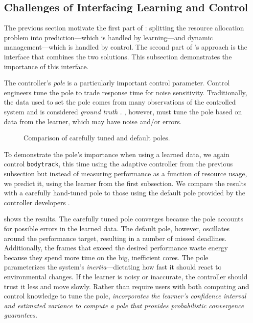 \subsection{Challenges of Interfacing Learning and Control}
The previous section motivate the first part of \SYSTEM{}: splitting
the resource allocation problem into prediction---which is handled by
learning---and dynamic management---which is handled by control. The
second part of \SYSTEM{}'s approach is the interface that combines the
two solutions.  This subsection demonstrates the importance of this
interface.

The controller's \emph{pole} is a particularly important control
parameter.  Control engineers tune the pole to trade response time for
noise sensitivity.  Traditionally, the data used to set the pole comes
from many observations of the controlled system and is considered
\emph{ground truth} \cite{Hellerstein2004a}.  \SYSTEM{}, however, must
tune the pole based on data from the learner, which may have noise
and/or errors.



\begin{figure} 

\caption{Comparison of carefully tuned and default poles.}
\label{fig:not-simple}
\end{figure}
To demonstrate the pole's importance when using a learned data, we
again control \texttt{bodytrack}, this time using the adaptive
controller from the previous subsection but instead of measuring
performance as a function of resource usage, we predict it, using the
learner from the first subsection.  We compare the results with a
carefully hand-tuned pole to those using the default pole provided by
the controller developers \cite{POET}.

 shows the results.  The carefully tuned pole
converges because the pole accounts for possible errors in the learned
data. The default pole, however, oscillates around the performance
target, resulting in a number of missed deadlines.  Additionally, the
frames that exceed the desired performance waste energy because they
spend more time on the big, inefficient cores. The pole parameterizes
the system's \emph{inertia}---dictating how fast it should react to
environmental changes.  If the learner is noisy or inaccurate, the
controller should trust it less and move slowly. Rather than require
users with both computing and control knowledge to tune the pole,
\emph{\SYSTEM{} incorporates the learner's confidence interval and
  estimated variance to compute a pole that provides probabilistic
  convergence guarantees.}


